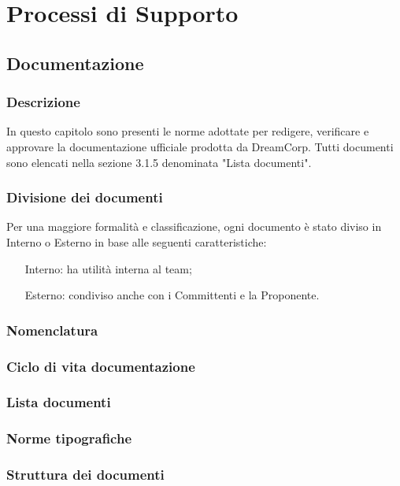 \section{Processi di Supporto}

\subsection{Documentazione}
\subsubsection{Descrizione}
In questo capitolo sono presenti le norme adottate per redigere, verificare e approvare la documentazione ufficiale prodotta da DreamCorp. Tutti documenti sono elencati nella sezione 3.1.5 denominata "Lista documenti".
\subsubsection{Divisione dei documenti}
Per una maggiore formalità e classificazione, ogni documento è stato diviso in Interno o Esterno in base alle seguenti caratteristiche:
\begin{itemize}
	\item[Interno:] ha utilità interna al team;
	\item[Esterno:] condiviso anche con i Committenti e la Proponente.
\end{itemize}
\subsubsection{Nomenclatura}

\subsubsection{Ciclo di vita documentazione}

\subsubsection{Lista documenti}

\subsubsection{Norme tipografiche}

\subsubsection{Struttura dei documenti}

